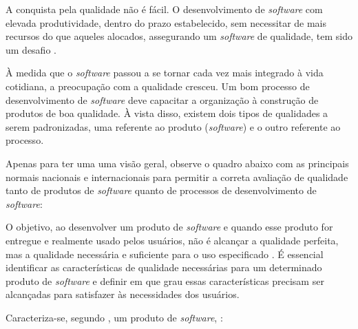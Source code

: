  A conquista pela qualidade não é fácil. O desenvolvimento de \textit{software} com elevada produtividade, dentro do prazo estabelecido, sem necessitar de mais recursos do que aqueles alocados, assegurando um \textit{software} de qualidade, tem sido um desafio \cite{SOMMERVILLE2003}.


À medida que o \textit{software} passou a se tornar cada vez mais integrado à vida cotidiana, a preocupação com a qualidade cresceu. Um bom processo de desenvolvimento de \textit{software} deve capacitar a organização à construção de produtos de boa qualidade. À vista disso, existem dois tipos de qualidades a serem padronizadas, uma referente ao produto (\textit{software}) e o outro referente ao processo. \cite{PRESSMAN2011}

Apenas para ter uma uma visão geral, observe o quadro
abaixo com as principais normais nacionais e internacionais para permitir a correta avaliação de qualidade tanto de produtos de \textit{software} quanto de processos de
desenvolvimento de \textit{software}:



O objetivo, ao desenvolver um produto de \textit{software} e quando esse produto for entregue e realmente usado pelos usuários, não é alcançar a qualidade perfeita, mas a qualidade necessária e suficiente para o uso especificado \cite{MALDONADO2001}. É essencial identificar as características de qualidade necessárias para um determinado
produto de \textit{software} e definir em que grau essas características precisam ser alcançadas para satisfazer às necessidades dos usuários.

Caracteriza-se, segundo , um produto de \textit{software},  :

